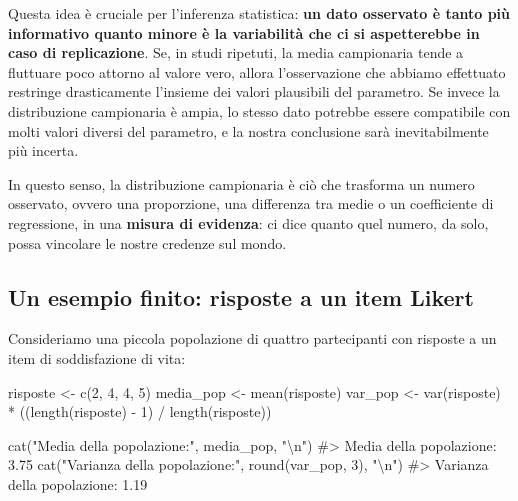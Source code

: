 \documentclass[
  italian,
  letterpaper,
  a4paper,
  11pt,
  open=any]{scrbook}
\newenvironment{Shaded}{\begin{snugshade}}{\end{snugshade}}
\newcommand{\CommentTok}[1]{\textcolor[rgb]{0.37,0.37,0.37}{#1}}
\newcommand{\DecValTok}[1]{\textcolor[rgb]{0.68,0.00,0.00}{#1}}
\newcommand{\FunctionTok}[1]{\textcolor[rgb]{0.28,0.35,0.67}{#1}}
\newcommand{\NormalTok}[1]{\textcolor[rgb]{0.00,0.23,0.31}{#1}}
\newcommand{\OtherTok}[1]{\textcolor[rgb]{0.00,0.23,0.31}{#1}}
\newcommand{\SpecialCharTok}[1]{\textcolor[rgb]{0.37,0.37,0.37}{#1}}
\newcommand{\StringTok}[1]{\textcolor[rgb]{0.13,0.47,0.30}{#1}}
\theoremstyle{plain}
\theoremstyle{definition}
\theoremstyle{definition}
\theoremstyle{remark}
\begin{document}
Questa idea è cruciale per l'inferenza statistica: \textbf{un dato
osservato è tanto più informativo quanto minore è la variabilità che ci
si aspetterebbe in caso di replicazione}. Se, in studi ripetuti, la
media campionaria tende a fluttuare poco attorno al valore vero, allora
l'osservazione che abbiamo effettuato restringe drasticamente l'insieme
dei valori plausibili del parametro. Se invece la distribuzione
campionaria è ampia, lo stesso dato potrebbe essere compatibile con
molti valori diversi del parametro, e la nostra conclusione sarà
inevitabilmente più incerta.

In questo senso, la distribuzione campionaria è ciò che trasforma un
numero osservato, ovvero una proporzione, una differenza tra medie o un
coefficiente di regressione, in una \textbf{misura di evidenza}: ci dice
quanto quel numero, da solo, possa vincolare le nostre credenze sul
mondo.

\subsection{Un esempio finito: risposte a un item
Likert}\label{un-esempio-finito-risposte-a-un-item-likert}

Consideriamo una piccola popolazione di quattro partecipanti con
risposte a un item di soddisfazione di vita:

\begin{Shaded}
\begin{Highlighting}[]
\NormalTok{risposte }\OtherTok{\textless{}{-}} \FunctionTok{c}\NormalTok{(}\DecValTok{2}\NormalTok{, }\DecValTok{4}\NormalTok{, }\DecValTok{4}\NormalTok{, }\DecValTok{5}\NormalTok{)}
\NormalTok{media\_pop }\OtherTok{\textless{}{-}} \FunctionTok{mean}\NormalTok{(risposte)}
\NormalTok{var\_pop }\OtherTok{\textless{}{-}} \FunctionTok{var}\NormalTok{(risposte) }\SpecialCharTok{*}\NormalTok{ ((}\FunctionTok{length}\NormalTok{(risposte) }\SpecialCharTok{{-}} \DecValTok{1}\NormalTok{) }\SpecialCharTok{/} \FunctionTok{length}\NormalTok{(risposte))}

\FunctionTok{cat}\NormalTok{(}\StringTok{"Media della popolazione:"}\NormalTok{, media\_pop, }\StringTok{"}\SpecialCharTok{\textbackslash{}n}\StringTok{"}\NormalTok{)}
\CommentTok{\#\textgreater{} Media della popolazione: 3.75}
\FunctionTok{cat}\NormalTok{(}\StringTok{"Varianza della popolazione:"}\NormalTok{, }\FunctionTok{round}\NormalTok{(var\_pop, }\DecValTok{3}\NormalTok{), }\StringTok{"}\SpecialCharTok{\textbackslash{}n}\StringTok{"}\NormalTok{)}
\CommentTok{\#\textgreater{} Varianza della popolazione: 1.19}
\end{Highlighting}
\end{Shaded}
\end{document}
